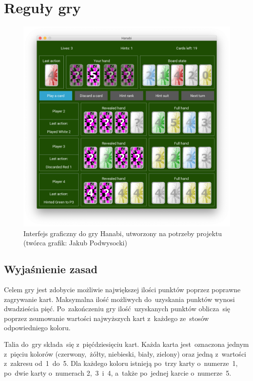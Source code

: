 \documentclass[declaration,shortabstract,inz]{iithesis}
\begin{document}
\chapter{Reguły gry}

\begin{figure}[ht!]
	\centering
	\captionsetup{format=hang}
	\includegraphics[width=\textwidth,height=\textheight,keepaspectratio]{GUI.png}
	\caption[Caption]{Interfejs graficzny do gry Hanabi, utworzony na potrzeby projektu (twórca grafik: Jakub Podwysocki)}
	\label{fig:GUI}
\end{figure}

\section{Wyjaśnienie zasad}

Celem gry jest zdobycie możliwie największej ilości punktów poprzez poprawne zagrywanie kart. Maksymalna ilość możliwych do~uzyskania punktów wynosi dwadzieścia pięć. Po~zakończeniu gry ilość uzyskanych punktów oblicza~się poprzez zsumowanie wartości najwyższych kart z~każdego ze~stosów odpowiedniego koloru.

Talia do~gry składa~się z~pięćdziesięciu kart. Każda karta jest~oznaczona jednym z~pięciu kolorów (czerwony, żółty, niebieski, biały, zielony) oraz jedną z~wartości z~zakresu od~1~do~5. Dla każdego koloru istnieją po~trzy karty o~numerze~1, po~dwie karty o~numerach 2,~3~i~4, a~także po~jednej karcie o~numerze~5.
\end{document}
